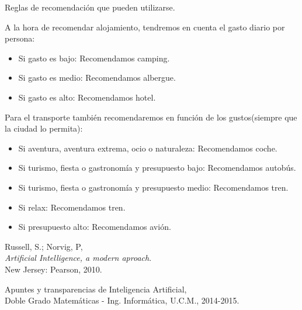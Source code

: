 \documentclass[11pt, a4paper, spanish, openright, twoside]{book}
\begin{document}
\begin{section}{Reglas de recomendación que pueden utilizarse.}
\begin{itemize}
				\end{itemize}
			A la hora de recomendar alojamiento, tendremos en cuenta el gasto diario por persona:
				\begin{itemize}
					\item Si gasto es bajo: Recomendamos camping.
					\item Si gasto es medio: Recomendamos albergue.
					\item Si gasto es alto: Recomendamos hotel.
				\end{itemize}
				
			Para el transporte también recomendaremos en función de los gustos(siempre que la ciudad lo permita):
				\begin{itemize}
					\item Si aventura, aventura extrema, ocio o naturaleza: Recomendamos coche.
					\item Si  turismo, fiesta o gastronomía y presupuesto bajo: Recomendamos autobús.
					\item Si turismo, fiesta o gastronomía y presupuesto medio: Recomendamos tren.
					\item Si relax: Recomendamos tren.
					\item Si presupuesto alto: Recomendamos avión.
				\end{itemize}
				
			
	\end{section}

	
\begin{thebibliography}{9}

	Russell, S.; Norvig, P, \\
	\emph{Artificial Intelligence, a modern aproach}.\\
	New Jersey: Pearson, 2010.
	
	Apuntes y transparencias de Inteligencia Artificial, \\
	Doble Grado Matemáticas - Ing. Informática, U.C.M., 2014-2015.

\end{thebibliography}
\end{document}
